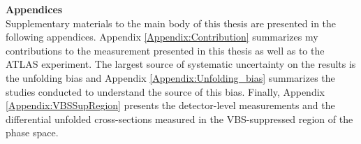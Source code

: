 \documentclass[red]{brandeis-dissertation}
\numberwithin{equation}{section}
\begin{document}

\startbody

\renewcommand{\partname}{Chapter}


\clearpage


	
	
	
	
\clearpage


	
	
	
	
\clearpage


	
	
	
	
	
	
\clearpage


\clearpage


\clearpage


\clearpage

% 
% 	
% 	

{\singlespacing
\renewcommand{\refname}{References}


\clearpage
}

\begin{appendices}
   \LARGE{\textbf{Appendices}} \\ 
   \normalsize 
   Supplementary materials to the main body of this thesis are presented in the following appendices. Appendix \ref{Appendix:Contribution} summarizes my contributions to the measurement presented in this thesis as well as to the ATLAS experiment. The largest source of systematic uncertainty on the results is the unfolding bias and Appendix \ref{Appendix:Unfolding_bias} summarizes the studies conducted to understand the source of this bias. Finally, Appendix \ref{Appendix:VBSSupRegion} presents the detector-level measurements and the differential unfolded cross-sections measured in the VBS-suppressed region of the phase space. 
 

	
\end{appendices}
\end{document}
